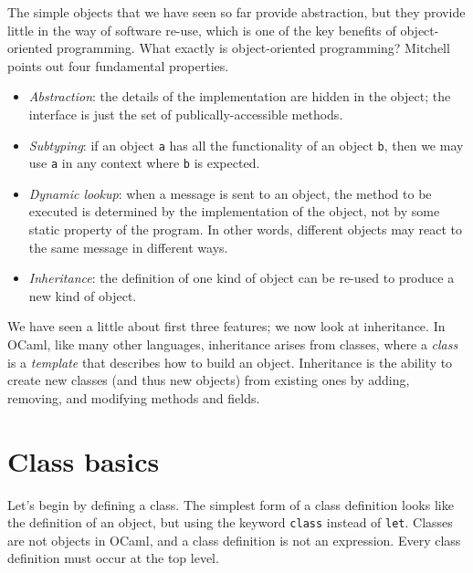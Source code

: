 
The simple objects that we have seen so far provide abstraction, but they provide
little in the way of software re-use, which is one of the key benefits of object-oriented
programming.  What exactly is object-oriented programming?  Mitchell~\cite{Mit03} points out four
fundamental properties.

\begin{itemize}
\item

\emph{Abstraction}:
the details of the implementation are hidden in the object; the interface is just the set of
publically-accessible methods.

\item

\emph{Subtyping}:
if an object \hbox{\lstinline/a/} has all the functionality of an object \hbox{\lstinline/b/}, then we may
use \hbox{\lstinline/a/} in any context where \hbox{\lstinline/b/} is expected.

\item

\emph{Dynamic lookup}:
when a message is sent to an object, the method to be executed is determined by the implementation
of the object, not by some static property of the program.  In other words, different objects may
react to the same message in different ways.

\item

\emph{Inheritance}:
the definition of one kind of object can be re-used to produce a new kind of object.
\end{itemize}
%
We have seen a little about first three features; we now look at inheritance.  In OCaml, like
many other languages, inheritance arises from classes, where a \emph{class} is a \emph{template}
that describes how to build an object.  Inheritance is the ability to create new classes (and thus
new objects) from existing ones by adding, removing, and modifying methods and fields.

\section{Class basics}

Let's begin by defining a class.  The simplest form of a class definition looks like the definition
of an object, but using the keyword \hbox{\lstinline/class/} instead of \hbox{\lstinline/let/}.  Classes are not
objects in OCaml, and a class definition is not an expression.  Every class definition must occur at
the top level.

